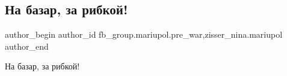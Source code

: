  
 
 
 
 

\subsection{На базар, за рибкой!}
\label{sec:26_02_2023.fb.fb_group.mariupol.pre_war.1.na_bazar__za_ribkoi_}
 
\ifcmt
 author_begin
   author_id fb_group.mariupol.pre_war,zisser_nina.mariupol
 author_end
\fi

На базар, за рибкой!
